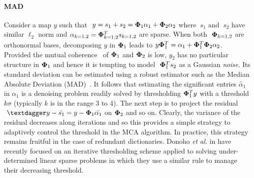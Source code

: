 \paragraph{MAD} Consider a map $y$ such that $ ~ y = s_1 + s_2 = {\bf \Phi}_1\alpha_1 + {\bf \Phi}_2\alpha_2$ 
where $ ~ s_1$ and $ ~ s_2$ have similar ${ \ell_2}$ norm and $ \alpha_{k=1,2} = {\bf \Phi}_{k=1,2}^T s_{k=1,2}$ are sparse. 
When both $ ~ {\bf \Phi}_{k=1,2}$ are orthonormal bases, decomposing $y$ in ${\bf \Phi}_{1}$ leads to 
$ y {\bf \Phi}_{1}^T = \alpha_1 + {\bf \Phi}_1^T{\bf \Phi}_2\alpha_2 $. Provided the mutual coherence~\cite{Elad-Bruckstein,miki:Gribonval-Nielsen,Donoho-Elad} 
of ${\bf \Phi}_1$ and ${\bf \Phi}_2$ is low, $y_2$ has no particular structure in ${\bf \Phi}_{1}$ and hence 
it is tempting to model $ ~ {\bf \Phi}_1^Ts_2$ as a Gaussian \emph{noise}. Its { standard deviation} can be 
estimated using a robust estimator such as the Median Absolute Deviation (MAD)~\cite{rest:donoho93_1}. It follows that 
estimating the significant entries $\tilde{\alpha_1}$ in $\alpha_1$ is a denoising problem readily solved 
by thresholding ${\bf \Phi}_{1}^T y$ with { a} threshold $k\sigma$ { (typically $k$ is in the range 3 to 4)}. 
The next step is to project the residual $ ~†y - \tilde{s_1} = y - {\bf \Phi}_{1}\tilde{\alpha_1}$ on ${\bf \Phi}_2$ and so on. 
Clearly, the variance of the residual decreases along iterations and so this provides a simple strategy to adaptively 
control the threshold in the MCA algorithm. In practice, this strategy remains fruitful in the case of redundant dictionaries. 
Donoho \emph{et al.} in \cite{starck:dave06} have recently focused on an iterative thresholding scheme applied to solving 
under-determined linear sparse problems in which they use a similar rule to manage their decreasing threshold.
%
